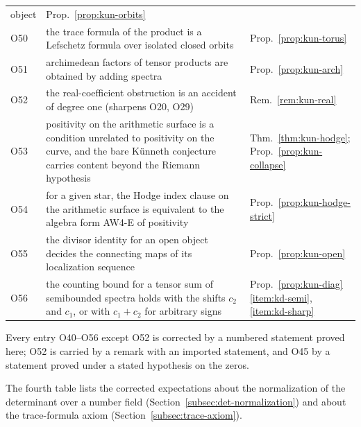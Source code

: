 \documentclass[11pt]{amsart}
\theoremstyle{plain}
\theoremstyle{definition}
\theoremstyle{remark}
\numberwithin{equation}{section}
\begin{document}
\begin{longtable}{@{}l>{\raggedright\arraybackslash}p{}
>{\raggedright\arraybackslash}p{}@{}}
  object & Prop.~\ref{prop:kun-orbits}\\
O50 & the trace formula of the product is a Lefschetz formula over
  isolated closed orbits & Prop.~\ref{prop:kun-torus}\\
O51 & archimedean factors of tensor products are obtained by adding
  spectra & Prop.~\ref{prop:kun-arch}\\
O52 & the real-coefficient obstruction is an accident of degree one
  (sharpens O20, O29) & Rem.~\ref{rem:kun-real}\\
O53 & positivity on the arithmetic surface is a condition unrelated to
  positivity on the curve, and the bare K\"unneth conjecture carries
  content beyond the Riemann hypothesis & Thm.~\ref{thm:kun-hodge};
  Prop.~\ref{prop:kun-collapse}\\
O54 & for a given star, the Hodge index clause on the arithmetic
  surface is equivalent to the algebra form AW4-E of positivity &
  Prop.~\ref{prop:kun-hodge-strict}\\
O55 & the divisor identity for an open object decides the connecting
  maps of its localization sequence & Prop.~\ref{prop:kun-open}\\
O56 & the counting bound for a tensor sum of semibounded spectra holds
  with the shifts $c_2$ and $c_1$, or with $c_1+c_2$ for arbitrary signs
  & Prop.~\ref{prop:kun-diag}\ref{item:kd-semi}, \ref{item:kd-sharp}\\
\end{longtable}

Every entry O40--O56 except O52 is corrected by a numbered statement
proved here; O52 is carried by a remark with an imported statement, and
O45 by a statement proved under a stated hypothesis on the zeros.

The fourth table lists the corrected expectations about the
normalization of the determinant over a number field
(Section~\ref{subsec:det-normalization}) and about the trace-formula
axiom (Section~\ref{subsec:trace-axiom}).
\end{document}
